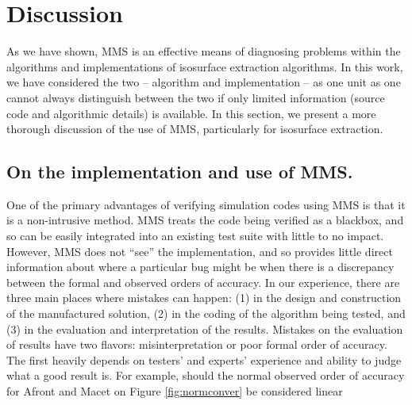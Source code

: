 \section{Discussion}
\label{chap1:sec:dis}

As we have shown, MMS is an effective means of diagnosing problems within 
the algorithms and implementations of isosurface extraction algorithms. 
In this work, we have considered the two -- algorithm and implementation --
as one unit as one cannot always distinguish between the two if only
limited information (source code and algorithmic details) is 
available.  In this section, we present a more thorough discussion 
of the use of MMS, particularly for isosurface extraction.

\subsection{On the implementation and use of MMS.}
One of the primary advantages of verifying simulation codes using MMS
is that it is a non-intrusive method. MMS treats the code being
verified as a blackbox, and so can be easily integrated into an existing
test suite with little to no impact.
%
%
However, MMS does not ``see'' the implementation, and so provides
little direct information about where a particular bug might be when there
is a discrepancy between the formal and observed orders of accuracy.
In our experience, there are three main places where mistakes can happen: (1) in
the design and construction of the manufactured solution, (2) in the coding of the
algorithm being tested, and (3) in the evaluation and interpretation
of the results. Mistakes on the evaluation of results have two flavors:
misinterpretation or poor formal order of accuracy. The first heavily
depends on testers' and experts' experience and ability to judge what
a good result is. For example, should the normal observed order of accuracy for
Afront and Macet on Figure \ref{fig:normconver} be considered linear
